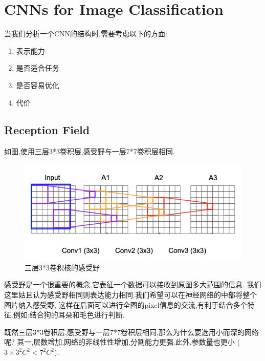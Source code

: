 \chapter{CNNs for Image Classification}

当我们分析一个CNN的结构时,需要考虑以下的方面:

\begin{enumerate}
	\item 表示能力
	\item 是否适合任务
	\item 是否容易优化
	\item 代价
\end{enumerate}

\section{Reception Field}

如图,使用三层3*3卷积层,感受野与一层7*7卷积层相同.

\begin{figure}[htbp]
	\centering
	\includegraphics[scale=0.85]{figures/receptivefield.png}
	\caption{三层3*3卷积核的感受野}
\end{figure}

感受野是一个很重要的概念,它表征一个数据可以接收到原图多大范围的信息.
我们这里姑且认为感受野相同则表达能力相同.我们希望可以在神经网络的中部将整个图片纳入感受野,
这样在后面可以进行全图的pixel信息的交流,有利于结合多个特征.例如:结合狗的耳朵和毛色进行判断.

既然三层3*3卷积层,感受野与一层7*7卷积层相同,那么为什么要选用小而深的网络呢?
其一,层数增加,网络的非线性性增加,分割能力更强.此外,参数量也更小 ($3\times 3^2 C^2 < 7^2C^2$).